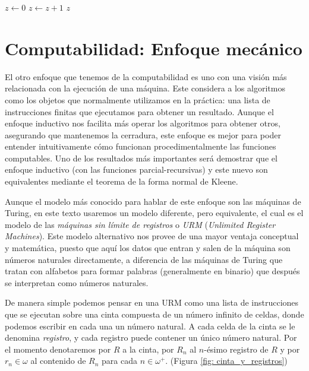\begin{algorithm}[h!]
	\caption{\emph{While}}

	\begin{algorithmic}
		\State $z\gets 0$
		\State $z\gets z + 1$
		\EndWhile
		\State \Return $z$
	\end{algorithmic}
\end{algorithm}

\section{Computabilidad: Enfoque mecánico}

El otro enfoque que tenemos de la computabilidad es uno con una visión más relacionada con la ejecución de una máquina. Este considera a los algoritmos como los objetos que normalmente utilizamos en la práctica: una lista de instrucciones finitas que ejecutamos para obtener un resultado. Aunque el enfoque inductivo nos facilita más operar los algoritmos para obtener otros, asegurando que mantenemos la cerradura, este enfoque es mejor para poder entender intuitivamente cómo funcionan procedimentalmente las funciones computables. Uno de los resultados más importantes será demostrar que el enfoque inductivo (con las funciones parcial-recursivas) y este nuevo son equivalentes mediante el teorema de la forma normal de Kleene.

Aunque el modelo más conocido para hablar de este enfoque son las máquinas de Turing, en este texto usaremos un modelo diferente, pero equivalente, el cual es el modelo de las \emph{máquinas sin límite de registros} o \emph{URM} (\emph{Unlimited Register Machines}). Este modelo alternativo nos provee de una mayor ventaja conceptual y matemática, puesto que aquí los datos que entran y salen de la máquina son números naturales directamente, a diferencia de las máquinas de Turing que tratan con alfabetos para formar palabras (generalmente en binario) que después se interpretan como números naturales.

De manera simple podemos pensar en una URM como una lista de instrucciones que se ejecutan sobre una cinta compuesta de un número infinito de celdas, donde podemos escribir en cada una un número natural. A cada celda de la cinta se le denomina \emph{registro}, y cada registro puede contener un único número natural. Por el momento denotaremos por $R$ a la cinta, por $R_{n}$ al $n$-ésimo registro de $R$ y por $r_{n}\in\omega$ al contenido de $R_{n}$ para cada $n\in\omega^{+}$. (Figura \ref{fig: cinta_y_registros})

